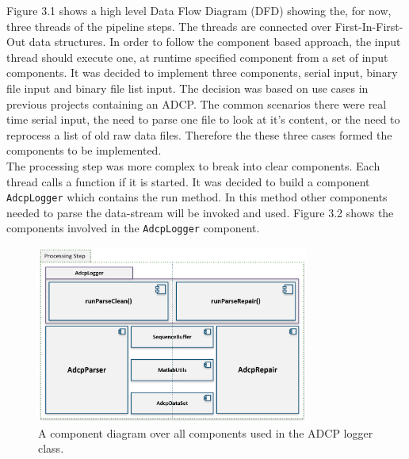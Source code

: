 Figure 3.1 shows a high level Data Flow Diagram (DFD) showing the, for now, three threads of the pipeline steps. The threads are connected over First-In-First-Out data structures. In order to follow the component based approach, the input thread should execute one, at runtime specified component from a set of input components. It was decided to implement three components, serial input, binary file input and binary file list input. The decision was based on use cases in previous projects containing an ADCP. The common scenarios there were real time serial input, the need to parse one file to look at it's content, or the need to reprocess a list of old raw data files. Therefore the these three cases formed the components to be implemented.\\ 
The processing step was more complex to break into clear components. Each thread calls a function if it is started. It was decided to build a component \texttt{AdcpLogger} which contains the run method. In this method other components needed to parse the data-stream will be invoked and used. Figure 3.2 shows the components involved in the \texttt{AdcpLogger} component. 
\begin{figure}[h]
\centering
      \includegraphics[width=0.8\textwidth]{components}
        \caption{A component diagram over all components used in the ADCP logger class.} 
\end{figure}
